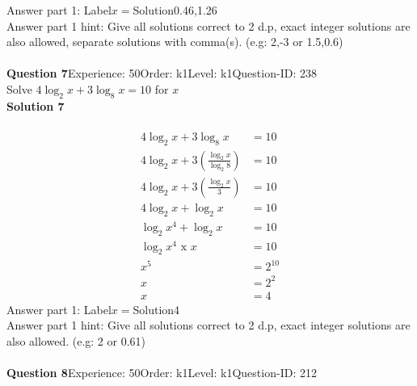 \documentclass{article}
\begin{document}
Answer part 1: \hspace{10pt}Label\hspace{10pt}$x=$\hspace{10pt}Solution\hspace{10pt}0.46,1.26\\
Answer part 1 hint: \hspace{15pt} Give all solutions correct to 2 d.p, exact integer solutions are also allowed, separate solutions with comma(s). (e.g: 2,-3 or 1.5,0.6)\\
\\[4pt]
\noindent\textbf{Question 7}\hspace{20pt}Experience: 50\hspace{20pt}Order: k1\hspace{20pt}Level: k1\hspace{20pt}Question-ID: 238\\[2pt]
Solve $4\log_{2}x+3\log_{8}x=10$ for $x$\\[4pt]
\noindent\textbf{Solution 7}\\[2pt]
\\[-35pt]\begin{align*}
4\log_{2}x+3\log_{8}x&=10\\[2pt]
4\log_{2}x+3\left(\displaystyle\frac{\log_{2}x}{\log_{2}8}\right)&=10\\[2pt]
4\log_{2}x+3\left(\displaystyle\frac{\log_{2}x}{3}\right)&=10\\[2pt]
4\log_{2}x+\log_{2}x&=10\\[2pt]
\log_{2}x^4+\log_{2}x&=10\\[2pt]
\log_{2}x^4\,\,\text{x}\,\,x&=10\\[2pt]
x^5&=2^{10}\\[2pt]
x&=2^2\\[2pt]
x&=4
\end{align*}
Answer part 1: \hspace{10pt}Label\hspace{10pt}$x=$\hspace{10pt}Solution\hspace{10pt}4\\
Answer part 1 hint: \hspace{15pt}Give all solutions correct to 2 d.p, exact integer solutions are also allowed. (e.g: 2 or 0.61)\\
\\[4pt]
\noindent\textbf{Question 8}\hspace{20pt}Experience: 50\hspace{20pt}Order: k1\hspace{20pt}Level: k1\hspace{20pt}Question-ID: 212\\[2pt]
\end{document}
